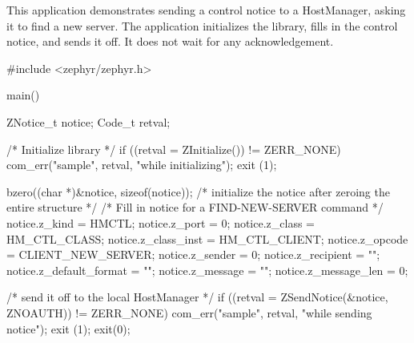 This application demonstrates sending a control notice to a HostManager, 
asking it to find a new server.  The application
initializes the library, fills in the control notice, and sends it off.
It does not wait for any acknowledgement.

\begin{code}
#include <zephyr/zephyr.h>

main()
{
    ZNotice_t notice;
    Code_t retval;

    /* Initialize library */
    if ((retval = ZInitialize()) != ZERR_NONE) {
        com_err("sample", retval, "while initializing");
        exit (1);
    }

    bzero((char *)&notice, sizeof(notice));
    /* initialize the notice after zeroing the entire structure */
    /* Fill in notice for a FIND-NEW-SERVER command */
    notice.z_kind = HMCTL;
    notice.z_port = 0;
    notice.z_class = HM_CTL_CLASS;
    notice.z_class_inst = HM_CTL_CLIENT;
    notice.z_opcode = CLIENT_NEW_SERVER;
    notice.z_sender = 0;
    notice.z_recipient = "";
    notice.z_default_format = "";
    notice.z_message = "";
    notice.z_message_len = 0;

    /* send it off to the local HostManager */
    if ((retval = ZSendNotice(&notice, ZNOAUTH)) != ZERR_NONE) {
        com_err("sample", retval, "while sending notice");
        exit (1);
    }
    exit(0);
}
\end{code}
